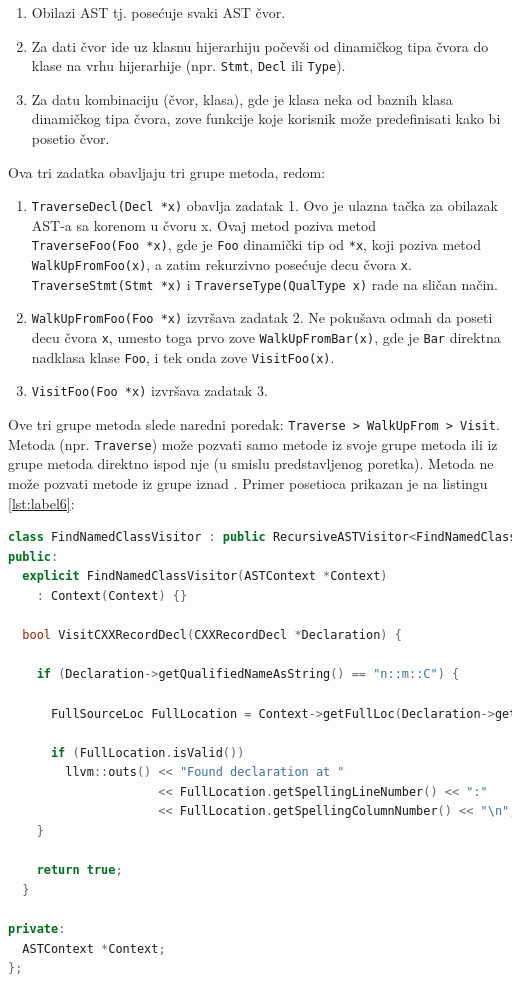 \documentclass[12pt,oneside]{memoir}
\begin{document}
\begin{enumerate}
\item Obilazi AST tj. posećuje svaki AST čvor.
\item Za dati čvor ide uz klasnu hijerarhiju počevši od dinamičkog tipa čvora do klase na vrhu hijerarhije (npr. \texttt{Stmt}, \texttt{Decl} ili \texttt{Type}).
\item Za datu kombinaciju (čvor, klasa), gde je klasa neka od baznih klasa dinamičkog tipa čvora, zove funkcije koje korisnik može predefinisati kako bi posetio čvor.
\end{enumerate}
Ova tri zadatka obavljaju tri grupe metoda, redom:
\begin{enumerate}
  \item \texttt{TraverseDecl(Decl *x)} obavlja zadatak 1. Ovo je ulazna tačka za obilazak AST-a sa korenom u čvoru x. Ovaj metod poziva metod \\ \texttt{TraverseFoo(Foo *x)}, gde je \texttt{Foo} dinamički tip od \texttt{*x}, koji poziva metod \texttt{WalkUpFromFoo(x)}, a zatim rekurzivno posećuje decu čvora \texttt{x}. \\ \texttt{TraverseStmt(Stmt *x)} i \texttt{TraverseType(QualType x)} rade na sličan način.
 
\item \texttt{WalkUpFromFoo(Foo *x)} izvršava zadatak 2. Ne pokušava odmah da poseti decu čvora \texttt{x}, umesto toga prvo zove \texttt{WalkUpFromBar(x)}, gde je \texttt{Bar} direktna nadklasa klase \texttt{Foo}, i tek onda zove \texttt{VisitFoo(x)}.
\item \texttt{VisitFoo(Foo *x)} izvršava zadatak 3.
\end{enumerate}
Ove tri grupe metoda slede naredni poredak: \texttt{Traverse > WalkUpFrom > Visit}. Metoda (npr. \texttt{Traverse}) može pozvati samo metode iz svoje grupe metoda ili iz grupe metoda direktno ispod nje (u smislu predstavljenog poretka). Metoda ne može pozvati metode iz grupe iznad \cite{visitors}.
Primer posetioca prikazan je na listingu \ref{lst:label6}:
\begin{lstlisting}[style=customc, caption={Primer posetioaca koji pose\'{c}uje sve strukture, unije i klase i ispisuje lokaciju onih koji se zovu n::m::C \cite{ASTToolTutorial}},label=lst:label6,language=C++, captionpos=b]
class FindNamedClassVisitor : public RecursiveASTVisitor<FindNamedClassVisitor> {
public:
  explicit FindNamedClassVisitor(ASTContext *Context)
    : Context(Context) {}

  bool VisitCXXRecordDecl(CXXRecordDecl *Declaration) {

    if (Declaration->getQualifiedNameAsString() == "n::m::C") {

      FullSourceLoc FullLocation = Context->getFullLoc(Declaration->getBeginLoc());

      if (FullLocation.isValid())
        llvm::outs() << "Found declaration at "
                     << FullLocation.getSpellingLineNumber() << ":"
                     << FullLocation.getSpellingColumnNumber() << "\n";
    }

    return true;
  }

private:
  ASTContext *Context;
};
\end{lstlisting}
\end{document}
